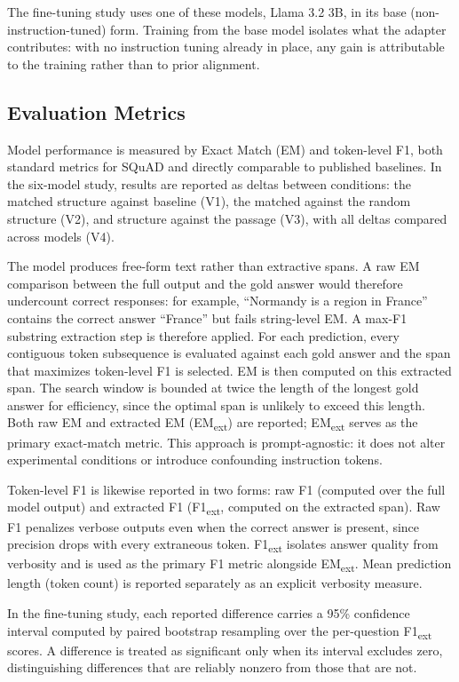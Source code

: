 \documentclass{article}
\begin{document}
The fine-tuning study uses one of these models, Llama 3.2 3B, in its base (non-instruction-tuned) form. Training from the base model isolates what the adapter contributes: with no instruction tuning already in place, any gain is attributable to the training rather than to prior alignment.

\subsection{Evaluation Metrics}

Model performance is measured by Exact Match (EM) and token-level F1, both standard metrics for SQuAD and directly comparable to published baselines. In the six-model study, results are reported as deltas between conditions: the matched structure against baseline (V1), the matched against the random structure (V2), and structure against the passage (V3), with all deltas compared across models (V4).

The model produces free-form text rather than extractive spans. A raw EM comparison between the full output and the gold answer would therefore undercount correct responses: for example, ``Normandy is a region in France'' contains the correct answer ``France'' but fails string-level EM. A max-F1 substring extraction step is therefore applied. For each prediction, every contiguous token subsequence is evaluated against each gold answer and the span that maximizes token-level F1 is selected. EM is then computed on this extracted span. The search window is bounded at twice the length of the longest gold answer for efficiency, since the optimal span is unlikely to exceed this length. Both raw EM and extracted EM (EM\textsubscript{ext}) are reported; EM\textsubscript{ext} serves as the primary exact-match metric. This approach is prompt-agnostic: it does not alter experimental conditions or introduce confounding instruction tokens.

Token-level F1 is likewise reported in two forms: raw F1 (computed over the full model output) and extracted F1 (F1\textsubscript{ext}, computed on the extracted span). Raw F1 penalizes verbose outputs even when the correct answer is present, since precision drops with every extraneous token. F1\textsubscript{ext} isolates answer quality from verbosity and is used as the primary F1 metric alongside EM\textsubscript{ext}. Mean prediction length (token count) is reported separately as an explicit verbosity measure.

In the fine-tuning study, each reported difference carries a 95\% confidence interval computed by paired bootstrap resampling over the per-question F1\textsubscript{ext} scores. A difference is treated as significant only when its interval excludes zero, distinguishing differences that are reliably nonzero from those that are not.
\end{document}
